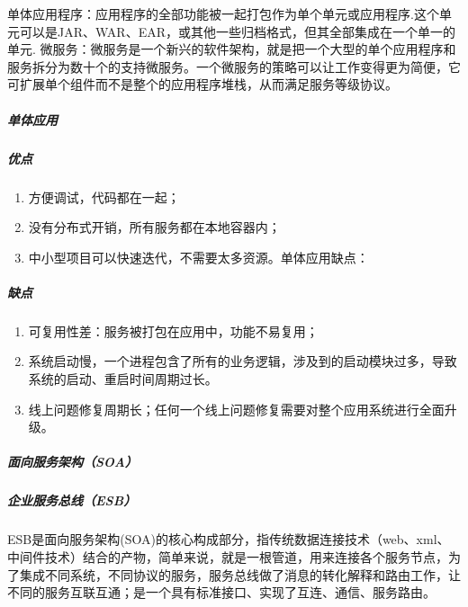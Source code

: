 \documentclass[letterpaper,11pt,english]{sphinxmanual}
\begin{document}
单体应用程序：应用程序的全部功能被一起打包作为单个单元或应用程序.这个单元可以是JAR、WAR、EAR，或其他一些归档格式，但其全部集成在一个单一的单元.
微服务：微服务是一个新兴的软件架构，就是把一个大型的单个应用程序和服务拆分为数十个的支持微服务。一个微服务的策略可以让工作变得更为简便，它可扩展单个组件而不是整个的应用程序堆栈，从而满足服务等级协议。


\subparagraph{单体应用}
\label{\detokenize{chapter_idea/understand_tech:id8}}

\subparagraph{优点}
\label{\detokenize{chapter_idea/understand_tech:id9}}\begin{enumerate}
%
\item {} 
方便调试，代码都在一起；

\item {} 
没有分布式开销，所有服务都在本地容器内；

\item {} 
中小型项目可以快速迭代，不需要太多资源。单体应用缺点：

\end{enumerate}


\subparagraph{缺点}
\label{\detokenize{chapter_idea/understand_tech:id10}}\begin{enumerate}
%
\item {} 
可复用性差：服务被打包在应用中，功能不易复用；

\item {} 
系统启动慢，一个进程包含了所有的业务逻辑，涉及到的启动模块过多，导致系统的启动、重启时间周期过长。

\item {} 
线上问题修复周期长；任何一个线上问题修复需要对整个应用系统进行全面升级。

\end{enumerate}


\subparagraph{面向服务架构（SOA）}
\label{\detokenize{chapter_idea/understand_tech:soa}}\label{\detokenize{chapter_idea/understand_tech:id12}}\label{\detokenize{chapter_idea/understand_tech:id11}}

\subparagraph{企业服务总线（ESB）}
\label{\detokenize{chapter_idea/understand_tech:esb}}
ESB是面向服务架构(SOA)的核心构成部分，指传统数据连接技术（web、xml、中间件技术）结合的产物，简单来说，就是一根管道，用来连接各个服务节点，为了集成不同系统，不同协议的服务，服务总线做了消息的转化解释和路由工作，让不同的服务互联互通；是一个具有标准接口、实现了互连、通信、服务路由。
\end{document}
